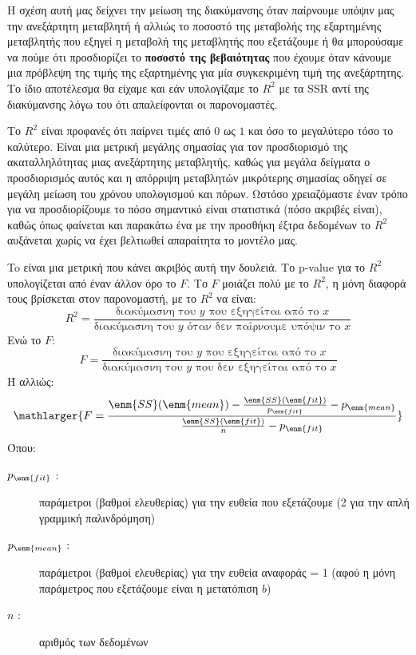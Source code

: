 Η σχέση αυτή μας δείχνει την μείωση της διακύμανσης όταν παίρνουμε υπόψιν μας την
ανεξάρτητη μεταβλητή ή αλλιώς το ποσοστό της μεταβολής της εξαρτημένης μεταβλητής που
εξηγεί η μεταβολή της μεταβλητής που εξετάζουμε ή θα μπορούσαμε να πούμε ότι
προσδιορίζει το \textbf{ποσοστό της βεβαιότητας} που έχουμε όταν κάνουμε μια πρόβλεψη της τιμής
της εξαρτημένης για μία συγκεκριμένη τιμή της ανεξάρτητης. Το ίδιο αποτέλεσμα θα είχαμε
και εάν υπολογίζαμε το $R^2$ με τα \textlatin{SSR} αντί της διακύμανσης λόγω του ότι απαλείφονται οι
παρονομαστές.

Το $R^2$
είναι προφανές ότι παίρνει τιμές από $0$ ως $1$ και όσο το μεγαλύτερο
τόσο το καλύτερο. Είναι μια μετρική μεγάλης σημασίας για τον προσδιορισμό της
ακαταλληλότητας μιας ανεξάρτητης μεταβλητής, καθώς για μεγάλα δείγματα ο
προσδιορισμός αυτός και η απόρριψη μεταβλητών μικρότερης σημασίας οδηγεί σε μεγάλη
μείωση του χρόνου υπολογισμού και πόρων. Ωστόσο χρειαζόμαστε έναν τρόπο για να
προσδιορίζουμε το πόσο σημαντικό είναι στατιστικά (πόσο ακριβές είναι), καθώς όπως
φαίνεται και παρακάτω ένα με την προσθήκη έξτρα δεδομένων το $R^2$ αυξάνεται χωρίς να έχει
βελτιωθεί απαραίτητα το μοντέλο μας.

To  είναι μια μετρική που κάνει ακριβός αυτή την δουλειά. Το \textlatin{p-value} για το $R^2$
υπολογίζεται από έναν άλλον όρο το $F$. Το $F$ μοιάζει πολύ με το $R^2$, η μόνη διαφορά τους
βρίσκεται στον παρονομαστή, με το $R^2$
να είναι:
$$R^2=\frac{\text{διακύμασνη του }y\text{ που εξηγείται από το }x}{\text{διακύμασνη του }y\text{ όταν δεν παίρνουμε υπόψιν το }x}$$
Ενώ το $F$:
$$F=\frac{\text{διακύμασνη του }y\text{ που εξηγείται από το }x}{\text{διακύμασνη του }y\text{ που δεν εξηγείται από το }x}$$
Ή αλλιώς:
$$\mathlarger{F =\frac{\enm{SS}(\enm{mean}) - \frac{\enm{SS}(\enm{fit})}{p_{\enm{fit}}} - p_{\enm{mean}}} {\frac{\enm{SS}(\enm{fit})}{n} - p_{\enm{fit}}}}$$
Όπου:
\begin{description}
    \item[$p_{\enm{fit}}$ :] παράμετροι (βαθμοί ελευθερίας) για την ευθεία που εξετάζουμε (2 για την απλή γραμμική παλινδρόμηση)
    \item[$p_{\enm{mean}}$ :]  παράμετροι (βαθμοί ελευθερίας) για την ευθεία αναφοράς = 1 (αφού η μόνη παράμετρος που εξετάζουμε είναι η μετατόπιση $b$)
    \item[$n$ :] αριθμός των δεδομένων
\end{description}

